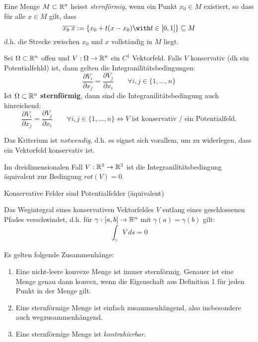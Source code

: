 \begin{definition} 
    Eine Menge $M \subset \mathbb{R}^n$ heisst \textit{sternförmig}, wenn     ein Punkt $x_0 \in M$ existiert, so dass für alle $x \in M$ gilt, dass 
    $$ \overline{x_0 \: x} := \{ x_0 + t(x-x_0) \with t \in [0,1]\} \subseteq M$$ d.h. die Strecke zwischen $x_0$ und $x$ vollständig in $M$ liegt.
\end{definition}

\begin{theorem}
    Sei $\Omega \subset \mathbb{R}^n$ offen und $V:\Omega \to \mathbb{R}^n$ ein $C^1$ Vektorfeld. Falls $V$ konservativ (dh ein Potentialfehld) ist, dann gelten die Integranilitätsbedingungen:
    $$ \frac{\partial V_i}{\partial x_j} = \frac{\partial V_j}{\partial x_i} \quad \quad \forall i,j \in \{1, \dots, n\}$$
    Ist $\Omega \subset \mathbb{R}^n$ \textbf{sternförmig}, dann sind die Integranilitätsbedingung auch hinreichend:
    $$ \frac{\partial V_i}{\partial x_j} = \frac{\partial V_j}{\partial x_i} \quad \quad \forall i,j \in \{1, \dots, n\} \iff V \mbox{ ist konservativ / ein Potentialfeld}.$$
\end{theorem}

\begin{remark}
    Das Kriterium ist \textit{notwendig}, d.h. es eignet sich vorallem, um zu widerlegen, dass ein Vektorfeld konservativ ist.
\end{remark}

\begin{remark}
    Im dreidimensionalen Fall $V : \mathbb{R}^3 \to \mathbb{R}^3$ ist die Integranilitätsbedingung äquivalent zur Bedingung $rot(V) = 0$.
\end{remark}

\begin{remark}
    Konservative Felder sind Potentialfelder (äquivalent)
\end{remark}

\begin{lemma}
    Das Wegintegral eines konservativen Vektorfeldes $V$ entlang eines geschlossenen Pfades verschwindet, d.h. für $\gamma:[a,b] \to \mathbb{R}^n$ mit $\gamma(a) = \gamma(b)$ gilt:
    $$ \int_\gamma V \: ds = 0$$
\end{lemma}

\begin{lemma} Es gelten folgende Zusammenhänge:
    \begin{enumerate}
        \item Eine nicht-leere konvexe Menge ist immer sternförmig. Genauer ist eine Menge genau dann konvex, wenn die Eigenschaft aus Definition 1 für jeden Punkt in der Menge gilt.
        \item Eine sternförmige Menge ist einfach zusammenhängend, also insbesondere auch wegzusammenhängend.
        \item Eine sternförmige Menge ist \textit{kontrahierbar}.
    \end{enumerate}
\end{lemma} 


